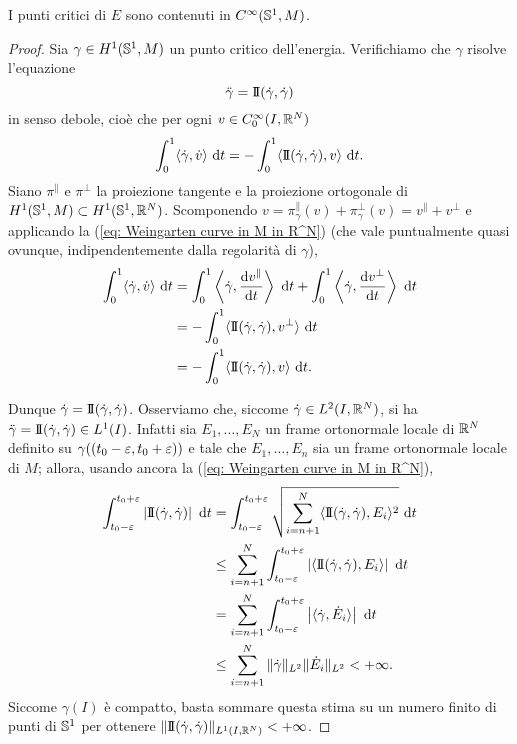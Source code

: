\begin{lemma}\label{lemma: regolarità punti critici di E}
	I punti critici di \(E\) sono contenuti in \(C^\infty(\mathbb{S}^1,M)\).
\end{lemma}
\begin{proof}
	Sia \(\gamma \in H^1(\mathbb{S}^1,M)\) un punto critico dell'energia. Verifichiamo che \(\gamma\) risolve l'equazione 
	\[
		\ddot \gamma = \mathrm{I\!I}(\dot \gamma,\dot \gamma)
	\] 
	in senso debole, cioè che per ogni \(v \in C^\infty_0(I,\mathbb{R}^N)\)
	\begin{align*}
		\int_0^1 \langle \dot \gamma, \dot v \rangle\ \mathrm{d} t = - \int_0^1 \langle \mathrm{I\!I}(\dot \gamma,\dot\gamma), v \rangle \ \mathrm{d} t.
	\end{align*}
	Siano \(\pi^\parallel\) e \(\pi^\perp\) la proiezione tangente e la proiezione ortogonale di \(H^1(\mathbb{S}^1,M) \subset H^1(\mathbb{S}^1,\mathbb{R}^N)\). Scomponendo \(v = \pi^\parallel_{\gamma}(v)+\pi^\perp_{\gamma}(v) = v^\parallel + v^\perp\) e applicando la (\ref{eq: Weingarten curve in M in R^N}) (che vale puntualmente quasi ovunque, indipendentemente dalla regolarità di \(\gamma\)),
	\begin{align*}
		\int_0^1 \langle \dot \gamma, \dot v \rangle \ \mathrm{d} t &= \int_0^1 \left\langle \dot \gamma, \frac{\mathrm{d} v^\parallel}{\mathrm{d} t} \right\rangle \ \mathrm{d} t +\int_0^1\left \langle \dot \gamma, \frac{\mathrm{d} v^\perp}{\mathrm{d} t} \right\rangle \ \mathrm{d} t  \\
		&=-\int_0^1 \langle \mathrm{I\!I}(\dot \gamma,\dot \gamma), v^\perp \rangle \ \mathrm{d} t \\
		&=-\int_0^1 \langle \mathrm{I\!I}(\dot \gamma,\dot \gamma), v\rangle \ \mathrm{d} t.
	\end{align*}
	
	Dunque \(\dot \gamma = \mathrm{I\!I}(\dot \gamma,\dot \gamma)\). Osserviamo che, siccome \(\dot \gamma \in L^2(I,\mathbb{R}^N)\), si ha \(\ddot \gamma = \mathrm{I\!I}(\dot \gamma,\dot \gamma) \in L^1(I)\). Infatti sia  \(E_1,\dots,E_N\) un frame ortonormale locale di \(\mathbb{R}^N\) definito su \(\gamma((t_0-\varepsilon,t_0+\varepsilon))\) e tale che \(E_1, \dots, E_n\) sia un frame ortonormale locale di \(M\); allora, usando ancora la (\ref{eq: Weingarten curve in M in R^N}),
	\begin{align*}
		\int_{t_0-\varepsilon}^{t_0+\varepsilon} \left| \mathrm{I\!I}(\dot \gamma, \dot \gamma) \right| \ \mathrm{d} t &= \int_{t_0-\varepsilon}^{t_0+\varepsilon} \sqrt{\sum_{i=n+1}^N \langle \mathrm{I\!I}(\dot \gamma, \dot \gamma), E_i \rangle^2} \ \mathrm{d} t \\
			&\leq \sum_{i=n+1}^N \int_{t_0-\varepsilon}^{t_0+\varepsilon} \left| \langle \mathrm{I\!I}(\dot \gamma, \dot \gamma), E_i \rangle \right| \ \mathrm{d} t \\
			&= \sum_{i=n+1}^N \int_{t_0-\varepsilon}^{t_0+\varepsilon} \left| \langle \dot \gamma, \dot E_i \rangle \right| \ \mathrm{d} t \\
			& \leq \sum_{i=n+1}^N \|\dot \gamma \|_{L^2} \|\dot E_i \|_{L^2} < + \infty.
	\end{align*}
	Siccome \(\gamma(I)\) è compatto, basta sommare questa stima su un numero finito di punti di \(\mathbb{S}^1\) per ottenere \(\|\mathrm{I\!I}(\dot \gamma, \dot \gamma)\|_{L^1(I, \mathbb{R}^N)} < +\infty\).
	

\end{proof}
